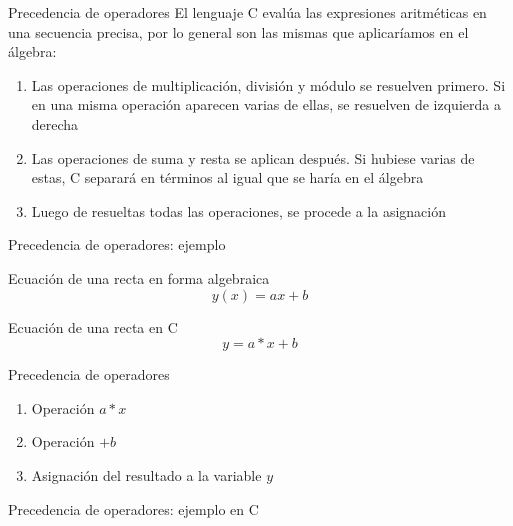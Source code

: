 \documentclass[xcolor=pdftex,table,11pt]{beamer}
\begin{document}
\begin{frame}{Precedencia de operadores}
El lenguaje C evalúa las expresiones aritméticas en una secuencia precisa, por lo general son las mismas que aplicaríamos en el álgebra:\\

\begin{enumerate}
\item<1->  Las operaciones de multiplicación, división y módulo se resuelven primero. Si en una misma operación aparecen varias de ellas, se resuelven de izquierda a derecha

\item<2->  Las operaciones de suma y resta se aplican después. Si hubiese varias de estas, C separará en términos al igual que se haría en el álgebra

\item<3-> Luego de resueltas todas las operaciones, se procede a la asignación

\end{enumerate}
\end{frame}

\begin{frame}{Precedencia de operadores: ejemplo}


 \begin{block}{Ecuación de una recta en forma algebraica}
\begin{equation}
y(x) = a x + b
\end{equation}
    \end{block}
    

 \begin{block}{Ecuación de una recta en C}
\begin{equation}
y = a * x + b
\end{equation}


  \end{block}

 \begin{block}{Precedencia de operadores}
 \begin{enumerate}
\item<1->  Operación $a * x$
\item<2->  Operación $+b$
\item<3->  Asignación del resultado a la variable $y$
\end{enumerate}
  \end{block}
\end{frame}
\begin{frame}{Precedencia de operadores: ejemplo en C}
\codesetstylefrombeamer
{}
\end{frame}
\end{document}
